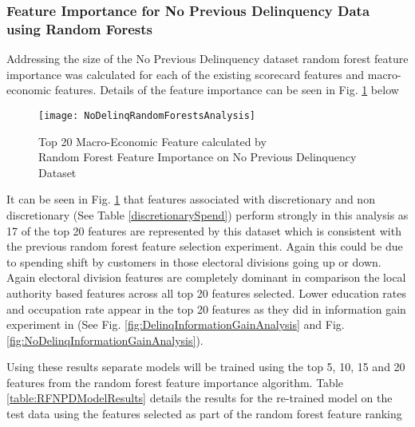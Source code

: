 \subsubsection{Feature Importance for No Previous Delinquency Data using Random Forests}\label{RFNPDExper}

Addressing the size of the No Previous Delinquency dataset random forest feature importance was calculated for
each of the existing scorecard features and macro-economic features. Details of the feature importance can be seen in Fig. \ref{fig:NoDelinqRandomForestsAnalysis} below

\begin{figure}[H]
	\texttt{[image: NoDelinqRandomForestsAnalysis]}
	\caption{Top 20 Macro-Economic Feature calculated by \\
		Random Forest Feature Importance on No Previous Delinquency Dataset}
	\label{fig:NoDelinqRandomForestsAnalysis}
\end{figure}


It can be seen in Fig. \ref{fig:NoDelinqRandomForestsAnalysis} that features associated with discretionary and non discretionary (See Table \ref{discretionarySpend}) perform strongly in this analysis as 17 of the top 20 features are represented by this dataset which is consistent with the previous random forest feature selection experiment. Again this could be due to spending shift by customers in those electoral divisions going up or down. Again electoral division features are completely dominant in comparison the local authority based features across all top 20 features selected. Lower education rates and occupation rate appear in the top 20 features as they did in information gain experiment in (See Fig. \ref{fig:DelinqInformationGainAnalysis} and Fig. \ref{fig:NoDelinqInformationGainAnalysis}).

Using these results separate models will be trained using the top 5, 10, 15 and 20 features from
the random forest feature importance algorithm. Table \ref{table:RFNPDModelResults} details the results for the re-trained model
on the test data using the features selected as part of the random forest feature ranking

